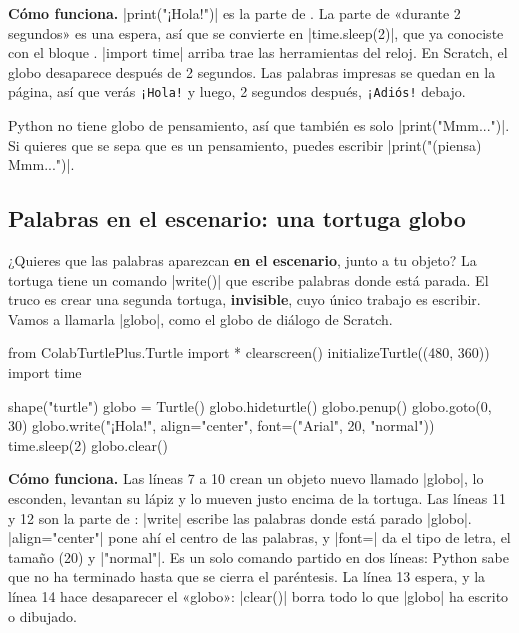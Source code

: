\textbf{Cómo funciona.} \py|print("¡Hola!")| es la parte de . La parte de «durante 2 segundos» es una espera, así que se convierte en \py|time.sleep(2)|, que ya conociste con el bloque . \py|import time| arriba trae las herramientas del reloj. En Scratch, el globo desaparece después de 2 segundos. Las palabras impresas se quedan en la página, así que verás \texttt{¡Hola!} y luego, 2 segundos después, \texttt{¡Adiós!} debajo.

\begin{think}[¿Y pensar?]
Python no tiene globo de pensamiento, así que  también es solo \py|print("Mmm...")|. Si quieres que se sepa que es un pensamiento, puedes escribir \py|print("(piensa) Mmm...")|.
\end{think}

\subsection*{Palabras en el escenario: una tortuga globo}

¿Quieres que las palabras aparezcan \textbf{en el escenario}, junto a tu objeto? La tortuga tiene un comando \py|write()| que escribe palabras donde está parada. El truco es crear una segunda tortuga, \textbf{invisible}, cuyo único trabajo es escribir. Vamos a llamarla \py|globo|, como el globo de diálogo de Scratch.

\begin{center}
\begin{scratch}
\end{scratch}
\end{center}

\begin{typethis}
from ColabTurtlePlus.Turtle import *
clearscreen()
initializeTurtle((480, 360))
import time

shape("turtle")
globo = Turtle()
globo.hideturtle()
globo.penup()
globo.goto(0, 30)
globo.write("¡Hola!", align="center",
            font=("Arial", 20, "normal"))
time.sleep(2)
globo.clear()
\end{typethis}

\textbf{Cómo funciona.} Las líneas 7 a 10 crean un objeto nuevo llamado \py|globo|, lo esconden, levantan su lápiz y lo mueven justo encima de la tortuga. Las líneas 11 y 12 son la parte de : \py|write| escribe las palabras donde está parado \py|globo|. \py|align="center"| pone ahí el centro de las palabras, y \py|font=| da el tipo de letra, el tamaño (20) y \py|"normal"|. Es un solo comando partido en dos líneas: Python sabe que no ha terminado hasta que se cierra el paréntesis. La línea 13 espera, y la línea 14 hace desaparecer el «globo»: \py|clear()| borra todo lo que \py|globo| ha escrito o dibujado.

